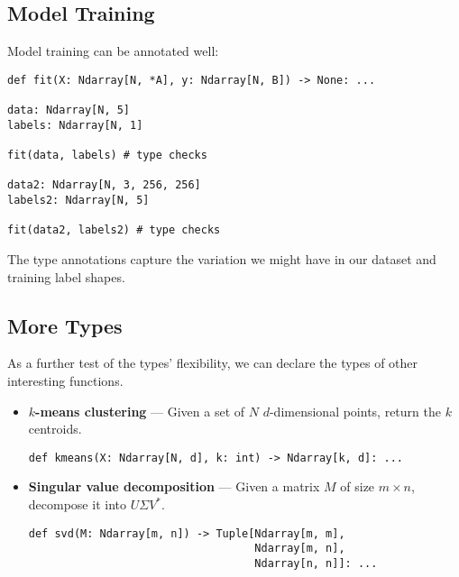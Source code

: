 \documentclass[12pt]{report}
\begin{document}
\subsection{Model Training}
Model training can be annotated well:
\begin{singlespace*}
    \begin{verbatim}
def fit(X: Ndarray[N, *A], y: Ndarray[N, B]) -> None: ...

data: Ndarray[N, 5]
labels: Ndarray[N, 1]

fit(data, labels) # type checks

data2: Ndarray[N, 3, 256, 256]
labels2: Ndarray[N, 5]

fit(data2, labels2) # type checks\end{verbatim}
\end{singlespace*}
The type annotations capture the variation we might have in our dataset and training label shapes.

\subsection{More Types}

As a further test of the types' flexibility, we can declare the types of other interesting functions.

\begin{itemize}
    \item \textbf{$k$-means clustering} --- Given a set of $N$ $d$-dimensional points, return the $k$ centroids.

\begin{singlespace*}
    \begin{verbatim}
def kmeans(X: Ndarray[N, d], k: int) -> Ndarray[k, d]: ... \end{verbatim}
\end{singlespace*}

\item \textbf{Singular value decomposition} --- Given a matrix $M$ of size $m \times n$, decompose it into $U\Sigma V^*$.

\begin{singlespace*}
    \begin{verbatim}
def svd(M: Ndarray[m, n]) -> Tuple[Ndarray[m, m],
                                   Ndarray[m, n],
                                   Ndarray[n, n]]: ...\end{verbatim}
\end{singlespace*}
\end{itemize}
\end{document}
